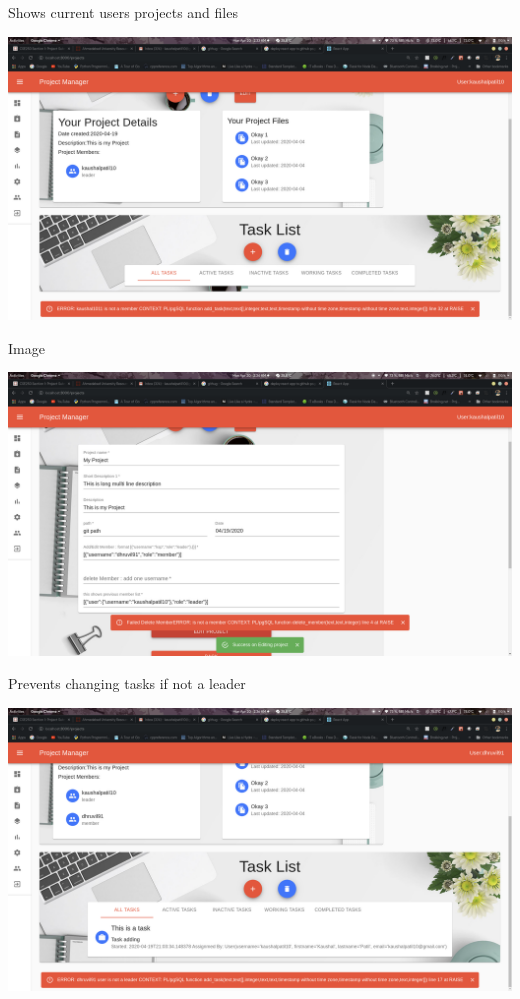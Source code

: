 \documentclass[conference,onecolumn]{IEEEtran}
\begin{document}
Shows current users projects and files

\includegraphics[scale=0.25]{./4.png}

Image

\includegraphics[scale=0.25]{./5.png}

Prevents changing tasks if not a leader

\includegraphics[scale=0.25]{./6.png}
\end{document}
